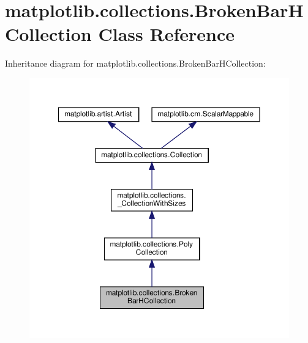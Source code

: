 \hypertarget{classmatplotlib_1_1collections_1_1BrokenBarHCollection}{}\section{matplotlib.\+collections.\+Broken\+Bar\+H\+Collection Class Reference}
\label{classmatplotlib_1_1collections_1_1BrokenBarHCollection}


Inheritance diagram for matplotlib.\+collections.\+Broken\+Bar\+H\+Collection\+:
\nopagebreak
\begin{figure}[H]
\begin{center}
\leavevmode
\includegraphics[width=350pt]{classmatplotlib_1_1collections_1_1BrokenBarHCollection__inherit__graph}
\end{center}
\end{figure}


